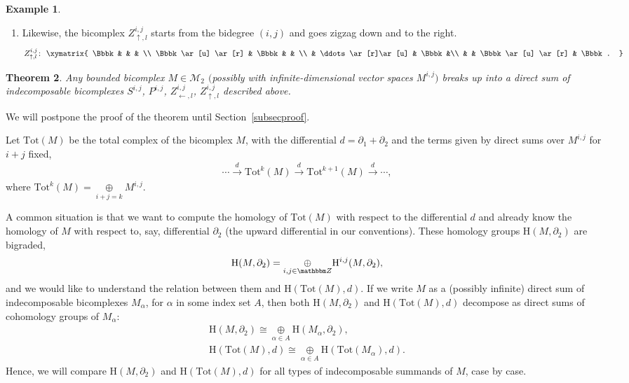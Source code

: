 \documentclass[10pt,a4paper]{amsart}
\newtheorem{thm}{Theorem}[section]
\theoremstyle{definition}
\newtheorem{Example}[thm]{Example}
\numberwithin{equation}{section}
\def\Z{{\mathbbm Z}}
\def\dif{\partial}
\def\lra{{\longrightarrow}}
\def\mc{\mathcal}
\newcommand{\oplusop}[1]{{\mathop{\oplus}\limits_{#1}}}
\newcommand{\mH}{\mathrm{H}} %
\newcommand{\Tot}{\mathrm{Tot}}
\begin{document}
\begin{Example}
\begin{enumerate}
\[\begin{gathered}
{ & & \ddots \ar[r]\ar[u] & \Bbbk\\
 & & & \Bbbk. \ar[u]
}
\end{gathered}
\]
\item[(4)] Likewise, the bicomplex $Z^{i,j}_{\uparrow,l}$ starts from the bidegree $(i,j)$ and goes zigzag down and to the right.
 \[
Z^{i,j}_{\uparrow,l}\colon \
\begin{gathered}
\xymatrix{
 \Bbbk & & & \\
 \Bbbk\ar[u] \ar[r] & \Bbbk & & \\
 & \ddots \ar[r]\ar[u] & \Bbbk &\\
 & & \Bbbk \ar[u] \ar[r] & \Bbbk.
}
\end{gathered}
\]

\end{enumerate}
\end{Example}

\begin{thm} \label{thmclassbicomplex}
Any bounded bicomplex $M\in \mc{M}_2$ $($possibly with infinite-dimensional
vector spaces $M^{i,j})$ breaks up into a direct sum of indecomposable bicomplexes
$S^{i,j}$, $P^{i,j}$, $Z^{i,j}_{\leftarrow,l}$, $Z^{i,j}_{\uparrow,l}$ described above.
\end{thm}

We will postpone the proof of the theorem until Section~\ref{subsecproof}.

Let $\Tot(M)$ be the total complex of the bicomplex $M$, with the
differential $d=\dif_1+\dif_2$ and the terms given by direct sums over
$M^{i,j}$ for $i+j$ fixed,
\begin{gather*}
 \cdots \stackrel{d}{\lra}
\Tot^k(M) \stackrel{d}{\lra} \Tot^{k+1}(M) \stackrel{d}{\lra} \cdots, \end{gather*}
where
$\Tot^k(M) = \oplusop{i+j=k} M^{i,j}$.


A common situation is that we want to compute the homology
of $\Tot(M)$ with respect to the differential $d$ and already
know the homology of $M$ with respect to, say, differential $\dif_2$
(the upward differential in our conventions).
These homology groups $\mH(M,\dif_2)$ are bigraded,
\begin{gather*} \mH(M,\dif_2) = \oplusop{i,j\in \Z} \mH^{i,j}(M,\dif_2) ,\end{gather*}
and we would like to understand the relation between them and
$\mH(\Tot(M),d)$.
If we write $M$ as a (possibly infinite) direct sum of indecomposable
bicomplexes $M_{\alpha}$, for $\alpha$ in some index set $A$,
then both $\mH(M,\dif_2)$ and $\mH(\Tot(M),d)$ decompose as direct sums
of cohomology groups of $M_{\alpha}$:
\begin{gather*}
 \mH(M,\dif_2) \cong \oplusop{\alpha\in A} \mH(M_{\alpha}, \dif_2), \\
 \mH(\Tot(M),d) \cong \oplusop{\alpha\in A} \mH(\Tot(M_{\alpha}), d).
\end{gather*}
Hence, we will compare $\mH(M,\dif_2)$ and $\mH(\Tot(M),d)$ for all types of indecomposable summands of $M$, case by case.
\end{document}
